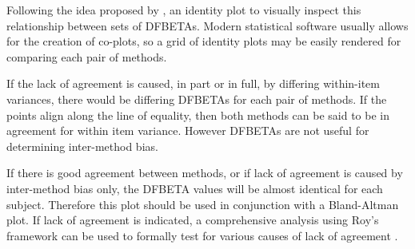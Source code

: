 \documentclass[12pt, a4paper]{report}
\theoremstyle{definition}
\theoremstyle{remark}
\begin{document}
Following the idea proposed by \citet{BA86}, an identity plot to visually inspect this relationship between sets of DFBETAs. Modern statistical software usually allows for the creation of co-plots, so a grid of identity plots may be easily rendered for comparing each pair of methods.

If the lack of agreement is caused, in part or in full, by differing within-item variances, there would be differing DFBETAs for each pair of methods. If the points align along the line of equality, then both methods can be said to be in agreement for within item variance. However DFBETAs are not useful for determining inter-method bias. 

If there is good agreement between methods, or if lack of agreement is caused by inter-method bias only, the DFBETA values will be almost identical for each subject. Therefore this plot should be used in conjunction with a Bland-Altman plot. If lack of agreement is indicated, a comprehensive analysis using Roy's framework can be used to formally test for various causes of lack of agreement \citep{ARoy2009}.
\end{document}
